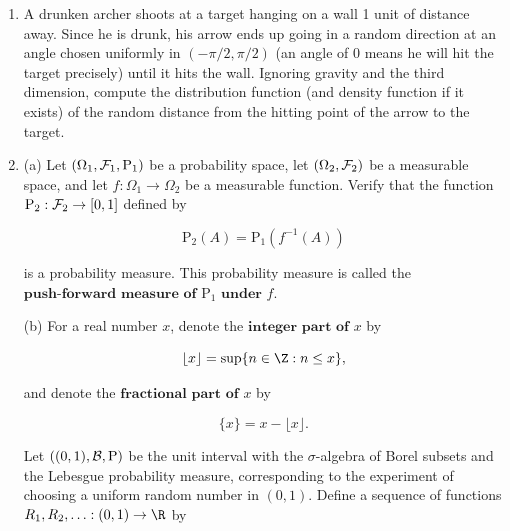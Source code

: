 \begin{enumerate}[label=\arabic*.]
\noindent Compute the lower and upper quantile functions of $F$,
defined by

\begin{center}
\end{center}

\noindent A recommended way is to plot $F$ on paper and then
figure out the quantiles by ``eyeballing''. Of course,
the answer should be spelled out in precise formulas.

\item A drunken archer shoots at a target hanging on a wall
1 unit of distance away. Since he is drunk, his arrow
ends up going in a random direction at an angle chosen
uniformly in $(-\pi/2,\pi/2)$ (an angle of $0$ means
he will hit the target precisely) until it hits the
wall. Ignoring gravity and the third dimension,
compute the distribution function (and density
function if it exists) of the random distance from the
hitting point of the arrow to the target.

\item (a) Let $(\Omega_1, {\cal F}_1, \mathrm{P}_1)$ be a
probability space, let $(\Omega_2, {\cal F}_2)$ be a
measurable space, and let $f:\Omega_1\to\Omega_2$ be
a measurable function. Verify that the function
$\mathrm{P}_2:{\cal F}_2\to [0,1]$ defined by

\[
\mathrm{P}_2(A) = \mathrm{P}_1(f^{-1}(A))
\]

\noindent is a probability measure. This probability measure is
called the
$\textbf{push-forward measure of } \mathrm{P}_1
\textbf{ under } f$.

(b) For a real number $x$, denote the
$\textbf{integer part of } x$ by

\[
\lfloor x \rfloor = \sup \{ n \in \Z : n \le x \},
\]

\noindent and denote the $\textbf{fractional part of } x$ by

\[
\{ x \} = x - \lfloor x \rfloor.
\]

\noindent Let $((0,1), {\cal B}, \mathrm{P})$ be the unit
interval with the $\sigma$-algebra of Borel subsets
and the Lebesgue probability measure, corresponding to
the experiment of choosing a uniform random number in
$(0,1)$. Define a sequence of functions
$R_1, R_2, \ldots : (0,1) \to \R$ by


\end{enumerate}

